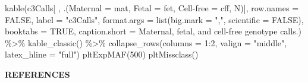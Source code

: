 \documentclass[11pt,letterpaper,oneside]{book}
\newenvironment{Shaded}{\begin{snugshade}}{\end{snugshade}}
\newcommand{\AttributeTok}[1]{\textcolor[rgb]{0.77,0.63,0.00}{#1}}
\newcommand{\ConstantTok}[1]{\textcolor[rgb]{0.00,0.00,0.00}{#1}}
\newcommand{\DecValTok}[1]{\textcolor[rgb]{0.00,0.00,0.81}{#1}}
\newcommand{\FunctionTok}[1]{\textcolor[rgb]{0.00,0.00,0.00}{#1}}
\newcommand{\NormalTok}[1]{#1}
\newcommand{\OtherTok}[1]{\textcolor[rgb]{0.56,0.35,0.01}{#1}}
\newcommand{\SpecialCharTok}[1]{\textcolor[rgb]{0.00,0.00,0.00}{#1}}
\newcommand{\StringTok}[1]{\textcolor[rgb]{0.31,0.60,0.02}{#1}}
\newcommand{\myonein}[1]{
\begin{center}
\bfseries\MakeUppercase{#1}
\end{center}
}
\begin{document}
\begin{Shaded}
\begin{Highlighting}[]
\FunctionTok{kable}\NormalTok{(c3Calls[ , .(}\AttributeTok{Maternal =}\NormalTok{ mat, }\AttributeTok{Fetal =}\NormalTok{ fet, }\StringTok{\textasciigrave{}}\AttributeTok{Cell{-}free}\StringTok{\textasciigrave{}} \OtherTok{=}\NormalTok{ cff, N)], }
      \AttributeTok{row.names =} \ConstantTok{FALSE}\NormalTok{,}
      \AttributeTok{label =} \StringTok{"c3Calls"}\NormalTok{,}
      \AttributeTok{format.args =} \FunctionTok{list}\NormalTok{(}\AttributeTok{big.mark =} \StringTok{","}\NormalTok{, }\AttributeTok{scientific =} \ConstantTok{FALSE}\NormalTok{),}
      \AttributeTok{booktabs =} \ConstantTok{TRUE}\NormalTok{,}
      \AttributeTok{caption.short =} \StringTok{\textquotesingle{}Maternal, fetal, and cell-free genotype calls.\textquotesingle{}}\NormalTok{) }\SpecialCharTok{\%\textgreater{}\%}
  \FunctionTok{kable\_classic}\NormalTok{() }\SpecialCharTok{\%\textgreater{}\%}
  \FunctionTok{collapse\_rows}\NormalTok{(}\AttributeTok{columns =} \DecValTok{1}\SpecialCharTok{:}\DecValTok{2}\NormalTok{, }\AttributeTok{valign =} \StringTok{"middle"}\NormalTok{, }\AttributeTok{latex\_hline =} \StringTok{"full"}\NormalTok{) }
\FunctionTok{pltExpMAF}\NormalTok{(}\DecValTok{500}\NormalTok{)}
\FunctionTok{pltMissclass}\NormalTok{()}
\end{Highlighting}
\end{Shaded}

\setlength{\parindent}{0ex}
\clearpage
{}
{}
\myonein{REFERENCES}
\end{document}

